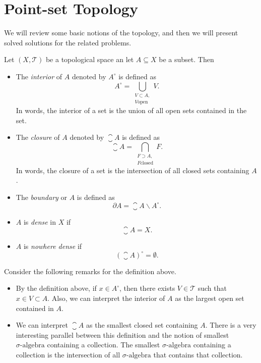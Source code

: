 \chapter{Point-set Topology}

We will review some basic notions of the topology, and then we will present solved solutions for the related problems.


\begin{definition}
	Let $ (X,\mathcal{T}) $ be a topological space an let $ A \subseteq X $ be a subset. Then 
	\begin{itemize}
		\item The \emph{interior} of $ A $ denoted by $ A^\circ $ is defined as
 \		\[ A^\circ = \bigcup_{\substack{V\subset A,\\ V \text{open}}} V.\]
		In words, the interior of a set is the union of all open sets contained in the set. 
		
		\item The \emph{closure} of $ A $ denoted by $ \closure{A} $ is defined as
		\[ \closure{A} = \bigcap_{\substack{F \supset A,\\ F \text{closed}}} F. \]
		In words, the closure of a set is the intersection of all closed sets containing $ A $.
		
		\item The \emph{boundary} or $ A $ is defined as
		\[ \partial A = \closure{A} \backslash A^\circ. \]
		
		\item $ A $ is \emph{dense} in $ X $ if
		\[ \closure{A} = X. \]
		
		\item $ A $ is \emph{nowhere dense} if 
		\[ (\closure{A})^\circ = \emptyset. \]
	\end{itemize}
\end{definition}

\begin{remark} 
	Consider the following remarks for the definition above.
	\begin{itemize}
		\item By the definition above, if $ x\in A^\circ $, then there exists $ V \in \mathcal{T} $ such that $ x \in V \subset A $. Also, we can interpret the interior of $ A $ as the largest open set contained in $ A $.
		
		\item We can interpret $ \closure{A} $ as the smallest closed set containing $ A $. There is a very interesting parallel between this definition and the notion of smallest $\sigma\text{-algebra}$ containing a collection. The smallest $\sigma\text{-algebra}$ containing a collection is the intersection of all $\sigma\text{-algebra}$ that contains that collection.
	\end{itemize}
\end{remark}

